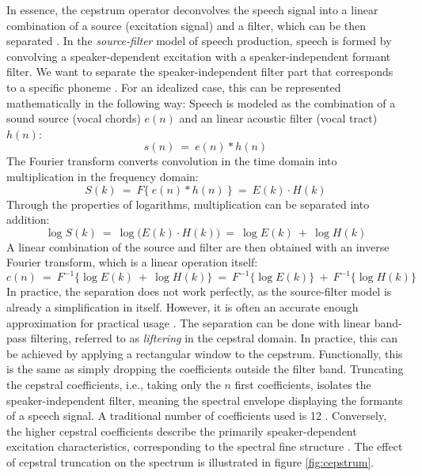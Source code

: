 \documentclass[english, 12pt, a4paper, pdftex, elec, utf8]{aaltothesis}
\begin{document}
In essence, the cepstrum operator deconvolves the speech signal into a linear combination of a source (excitation signal) and a filter, which can be then separated \cite[p.~306--307]{huang2001spoken}. In the \textit{source-filter} model of speech production, speech is formed by convolving a speaker-dependent excitation with a speaker-independent formant filter. We want to separate the speaker-independent filter part that corresponds to a specific phoneme \cite[p.~288--290]{huang2001spoken}. For an idealized case, this can be represented mathematically in the following way: Speech is modeled as the combination of a sound source (vocal chords) $e(n)$ and an linear acoustic filter (vocal tract) $h(n)$:
\begin{equation}
s(n) \ = \ e(n) * h(n)
\end{equation}
The Fourier transform converts convolution in the time domain into multiplication in the frequency domain:
\begin{equation}
S(k) \ = \ F\big\{ \ e(n) * h(n) \ \big\} \ = \ E(k) \cdot H(k)
\end{equation}
Through the properties of logarithms, multiplication can be separated into addition:
\begin{equation}
\log S(k) \ = \ \log \big( E(k) \cdot H(k) \big) \ = \ \log E(k) \ + \ \log H(k)
\end{equation}
A linear combination of the source and filter are then obtained with an inverse Fourier transform, which is a linear operation itself:
\begin{equation}
c(n) \ = \ F^{-1} \big\{ \log E(k) \ + \ \log H(k) \big\} \ = \ F^{-1} \big\{\log  E(k) \big\} \ + \ F^{-1} \big\{\log H(k) \big\}
\end{equation}
In practice, the separation does not work perfectly, as the source-filter model is already a simplification in itself. However, it is often an accurate enough approximation for practical usage \cite[p.~314]{huang2001spoken}. The separation can be done with linear band-pass filtering, referred to as \textit{liftering} in the cepstral domain. In practice, this can be achieved by applying a rectangular window to the cepstrum. Functionally, this is the same as simply dropping the coefficients outside the filter band. Truncating the cepstral coefficients, i.e., taking only the $n$ first coefficients, isolates the speaker-independent filter, meaning the spectral envelope displaying the formants of a speech signal. A traditional number of coefficients used is 12 \cite{huang2001spoken, gales2008application}. Conversely, the higher cepstral coefficients describe the primarily speaker-dependent excitation characteristics, corresponding to the spectral fine structure \cite{gales2008application}. The effect of cepstral truncation on the spectrum is illustrated in figure \ref{fig:cepstrum}.
\end{document}
